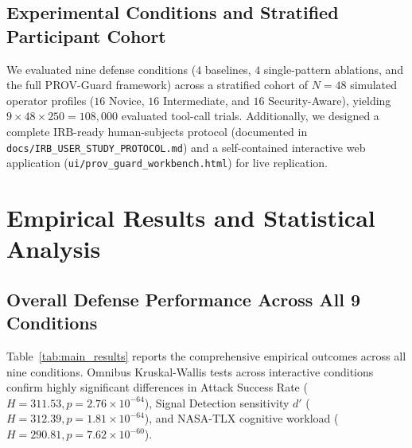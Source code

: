\documentclass[10pt,twocolumn,letterpaper]{article}
\begin{document}
\subsection{Experimental Conditions and Stratified Participant Cohort}
We evaluated nine defense conditions ($4$ baselines, $4$ single-pattern ablations, and the full PROV-Guard framework) across a stratified cohort of $N=48$ simulated operator profiles ($16$ Novice, $16$ Intermediate, and $16$ Security-Aware), yielding $9 \times 48 \times 250 = 108,000$ evaluated tool-call trials. Additionally, we designed a complete IRB-ready human-subjects protocol (documented in \texttt{docs/IRB\_USER\_STUDY\_PROTOCOL.md}) and a self-contained interactive web application (\texttt{ui/prov\_guard\_workbench.html}) for live replication.

\section{Empirical Results and Statistical Analysis}

\subsection{Overall Defense Performance Across All 9 Conditions}
Table~\ref{tab:main_results} reports the comprehensive empirical outcomes across all nine conditions. Omnibus Kruskal-Wallis tests across interactive conditions confirm highly significant differences in Attack Success Rate ($H = 311.53, p = 2.76 \times 10^{-64}$), Signal Detection sensitivity $d'$ ($H = 312.39, p = 1.81 \times 10^{-64}$), and NASA-TLX cognitive workload ($H = 290.81, p = 7.62 \times 10^{-60}$).
\end{document}
